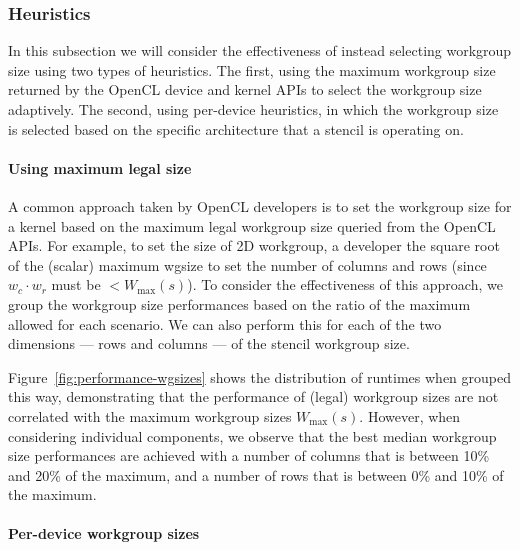 \documentclass[nonatbib,preprint,10pt]{sigplanconf}
\begin{document}
\subsubsection{Heuristics}

In this subsection we will consider the effectiveness of instead
selecting workgroup size using two types of heuristics. The first,
using the maximum workgroup size returned by the OpenCL device and
kernel APIs to select the workgroup size adaptively. The second, using
per-device heuristics, in which the workgroup size is selected based
on the specific architecture that a stencil is operating on.

\paragraph{Using maximum legal size}

A common approach taken by OpenCL developers is to set the workgroup
size for a kernel based on the maximum legal workgroup size queried
from the OpenCL APIs. For example, to set the size of 2D workgroup, a
developer the square root of the (scalar) maximum wgsize to set the
number of columns and rows (since $w_c \cdot w_r$ must be
$< W_{\max}(s)$). To consider the effectiveness of this approach, we
group the workgroup size performances based on the ratio of the
maximum allowed for each scenario. We can also perform this for each
of the two dimensions --- rows and columns --- of the stencil
workgroup size.

Figure~\ref{fig:performance-wgsizes} shows the distribution of
runtimes when grouped this way, demonstrating that the performance of
(legal) workgroup sizes are not correlated with the maximum workgroup
sizes $W_{\max}(s)$. However, when considering individual components,
we observe that the best median workgroup size performances are
achieved with a number of columns that is between 10\% and 20\% of the
maximum, and a number of rows that is between 0\% and 10\% of the
maximum.

\paragraph{Per-device workgroup sizes}
\end{document}
